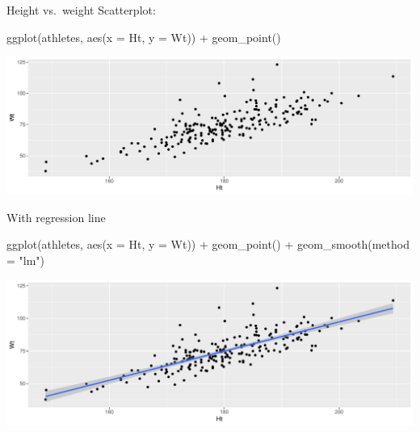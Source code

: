\documentclass[
  ignorenonframetext,
]{beamer}
\newenvironment{Shaded}{\begin{snugshade}}{\end{snugshade}}
\newcommand{\AttributeTok}[1]{\textcolor[rgb]{0.40,0.45,0.13}{#1}}
\newcommand{\FunctionTok}[1]{\textcolor[rgb]{0.28,0.35,0.67}{#1}}
\newcommand{\NormalTok}[1]{\textcolor[rgb]{0.00,0.23,0.31}{#1}}
\newcommand{\SpecialCharTok}[1]{\textcolor[rgb]{0.37,0.37,0.37}{#1}}
\newcommand{\StringTok}[1]{\textcolor[rgb]{0.13,0.47,0.30}{#1}}
\begin{document}
\begin{frame}[fragile]{Height vs.~weight}
\label{height-vs.-weight}
Scatterplot:

\begin{Shaded}
\begin{Highlighting}[]
\FunctionTok{ggplot}\NormalTok{(athletes, }\FunctionTok{aes}\NormalTok{(}\AttributeTok{x =}\NormalTok{ Ht, }\AttributeTok{y =}\NormalTok{ Wt)) }\SpecialCharTok{+} \FunctionTok{geom\_point}\NormalTok{()}
\end{Highlighting}
\end{Shaded}

\includegraphics{graphs_files/figure-beamer/graphs-R-8-1.pdf}
\end{frame}

\begin{frame}[fragile]{With regression line}
\label{with-regression-line}
\begin{Shaded}
\begin{Highlighting}[]
\FunctionTok{ggplot}\NormalTok{(athletes, }\FunctionTok{aes}\NormalTok{(}\AttributeTok{x =}\NormalTok{ Ht, }\AttributeTok{y =}\NormalTok{ Wt)) }\SpecialCharTok{+}
  \FunctionTok{geom\_point}\NormalTok{() }\SpecialCharTok{+} \FunctionTok{geom\_smooth}\NormalTok{(}\AttributeTok{method =} \StringTok{"lm"}\NormalTok{)}
\end{Highlighting}
\end{Shaded}

\includegraphics{graphs_files/figure-beamer/graphs-R-9-1.pdf}
\end{frame}
\end{document}

